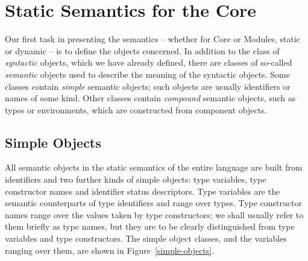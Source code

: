 \section{Static Semantics for the Core}
Our first task in presenting the semantics -- whether for Core or Modules,
static or dynamic -- is to define the objects concerned. In addition
to the class of {\sl syntactic} objects, which we have already defined, 
there are classes of so-called {\sl semantic} objects used to describe
the meaning of the syntactic objects. Some classes contain {\sl simple}
semantic objects; such objects are usually identifiers or names of some
kind. Other classes contain {\sl compound} semantic objects, such as
types or environments, which are constructed from component objects.

\subsection{Simple Objects}
All semantic objects in the static semantics of the entire language
are built from identifiers and two further kinds of simple objects:
type variables, type constructor names and identifier status descriptors.
Type variables are the semantic counterparts of type identifiers and range
over types.
Type
constructor names range over the values taken by type constructors; we shall
usually refer to them briefly as type names, but they are to be
clearly distinguished from type variables and type constructors. The
simple object classes, and the variables ranging over them, are shown
in Figure~\ref{simple-objects}.

